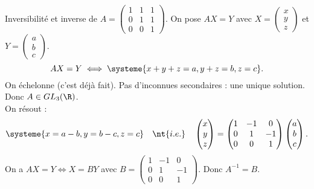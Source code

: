 \documentclass[11pt]{article}
\begin{document}
\begin{ex}{}{}
    Inversibilité et inverse de $A=\begin{pmatrix}1&1&1\\0&1&1\\0&0&1\end{pmatrix}$.
    \tcblower
     On pose $AX=Y$ avec $X=\begin{pmatrix}x\\y\\z\end{pmatrix}$ et $Y=\begin{pmatrix}a\\b\\c\end{pmatrix}$.
    \begin{equation*}
        AX=Y \iff \systeme{x+y+z=a,y+z=b,z=c}.
    \end{equation*}
     On échelonne (c'est déjà fait). Pas d'inconnues secondaires : une unique solution. Donc $A\in GL_3(\R)$.\\
     On résout :
    \begin{equation*}
        \systeme{x=a-b,y=b-c,z=c} \quad\nt{i.e.}\quad\begin{pmatrix}x\\y\\z\end{pmatrix}=\begin{pmatrix}1&-1&0\\0&1&-1\\0&0&1\end{pmatrix}\begin{pmatrix}a\\b\\c\end{pmatrix}.
    \end{equation*}
    On a $AX=Y\iff X=BY$ avec $B=\begin{pmatrix}1&-1&0\\0&1&-1\\0&0&1\end{pmatrix}$. Donc $A^{-1}=B$.
\end{ex}

\pagebreak
\end{document}

